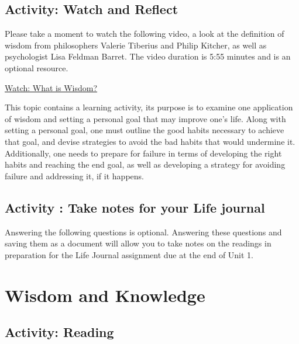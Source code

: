 \documentclass[
]{book}
\begin{document}
\hypertarget{activity-watch-and-reflect}{%
\subsection*{Activity: Watch and Reflect}\label{activity-watch-and-reflect}}

\begin{reflect}
Please take a moment to watch the following video, a look at the definition of wisdom from philosophers Valerie Tiberius and Philip Kitcher, as well as psychologist Lisa Feldman Barret. The video duration is 5:55 minutes and is an optional resource.

\href{https://www.youtube.com/watch?v=obqedyeUcwk}{Watch: What is Wisdom?}
\end{reflect}

This topic contains a learning activity, its purpose is to examine one application of wisdom and setting a personal goal that may improve one's life. Along with setting a personal goal, one must outline the good habits necessary to achieve that goal, and devise strategies to avoid the bad habits that would undermine it. Additionally, one needs to prepare for failure in terms of developing the right habits and reaching the end goal, as well as developing a strategy for avoiding failure and addressing it, if it happens.

\hypertarget{activity-take-notes-for-your-life-journal}{%
\subsection*{Activity : Take notes for your Life journal}\label{activity-take-notes-for-your-life-journal}}

\begin{reflect}
Answering the following questions is optional. Answering these questions and saving them as a document will allow you to take notes on the readings in preparation for the Life Journal assignment due at the end of Unit 1.
\end{reflect}

\hypertarget{wisdom-and-knowledge}{%
\section{Wisdom and Knowledge}\label{wisdom-and-knowledge}}

\hypertarget{activity-reading-1}{%
\subsection*{Activity: Reading}\label{activity-reading-1}}
\end{document}
